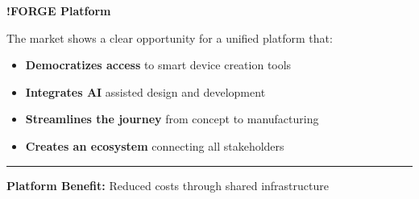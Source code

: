 \begin{tcolorbox}[
    colback=fabLight!30,
    colframe=fabPrimary,
    arc=4pt,
    boxrule=1pt,
    title={\textbf{Opportunity Gap}},
    fonttitle=\large,
    coltitle=fabPrimary
]

\begin{center}
\textbf{\large !FORGE Platform}
\end{center}

\vspace{0.3cm}

\noindent The market shows a clear opportunity for a unified platform that:

\begin{minipage}{0.48\textwidth}
\begin{itemize}
    \item[\textcolor{fabPrimary}{\faLightbulbO}] \textbf{Democratizes access} to smart device creation tools
    \item[\textcolor{fabPrimary}{\faMagic}] \textbf{Integrates AI} assisted design and development
\end{itemize}
\end{minipage}
\hfill
\begin{minipage}{0.48\textwidth}
\begin{itemize}
    \item[\textcolor{fabPrimary}{\faRoad}] \textbf{Streamlines the journey} from concept to manufacturing
    \item[\textcolor{fabPrimary}{\faShareAlt}] \textbf{Creates an ecosystem} connecting all stakeholders
\end{itemize}
\end{minipage}

\vspace{0.5cm}
\begin{center}
\textcolor{fabPrimary}{\rule{0.6\textwidth}{1pt}}

\vspace{0.3cm}
\begin{minipage}{0.8\textwidth}
\centering
\textbf{\large Platform Benefit:} Reduced costs through shared infrastructure
\end{minipage}
\end{center}

\end{tcolorbox}